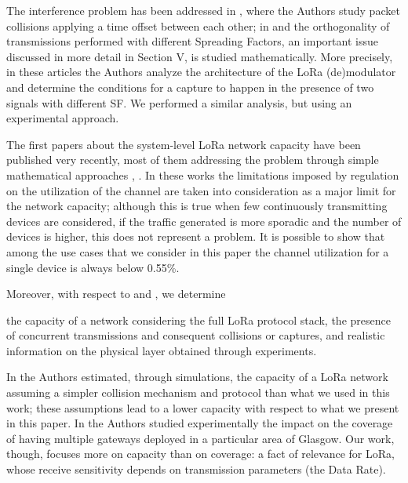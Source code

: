 The interference problem has been addressed in \cite{bor_lora_nodate},
	where the Authors study packet collisions applying a time offset between each other;
	in \cite{georgiou_low_2017} and \cite{goursaud_dedicated_2015} the orthogonality of transmissions performed with different Spreading Factors,
	an important issue discussed in more detail in Section V,
	is studied mathematically.
More precisely,
	in these articles the Authors analyze the architecture of the LoRa (de)modulator and determine the conditions for a capture to happen in the presence of two signals with different SF.
We performed a similar analysis,
	but using an experimental approach.

The first papers about the system-level LoRa network capacity have been published very recently,
	most of them addressing the problem through simple mathematical approaches \cite{mikhaylov_analysis_2016},
	\cite{adelantado_understanding_2017}.
In these works the limitations imposed by regulation on the utilization of the channel are taken into consideration as a major limit for the network capacity;
	although this is true when few continuously transmitting devices are considered,
	if the traffic generated is more sporadic and the number of devices is higher,
	this does not represent a problem.
It is possible to show that among the use cases that we consider in this paper the channel utilization for a single device is always below 0.55\%.

Moreover,
	with respect to \cite{mikhaylov_analysis_2016} and \cite{adelantado_understanding_2017},
	we determine

the capacity of a network considering the full LoRa protocol stack,
	the presence of concurrent transmissions and consequent collisions or captures,
	and realistic information on the physical layer obtained through experiments.

In \cite{bor_lora_2016} the Authors estimated,
	through simulations,
	the capacity of a LoRa network assuming a simpler collision mechanism and protocol than what we used in this work;
	these assumptions lead to a lower capacity with respect to what we present in this paper.
In \cite{wixted_evaluation_2016} the Authors studied experimentally the impact on the coverage of having multiple gateways deployed in a particular area of Glasgow.
Our work,
	though,
	focuses more on capacity than on coverage:
	a fact of relevance for LoRa,
	whose receive sensitivity depends on transmission parameters (the Data Rate).

